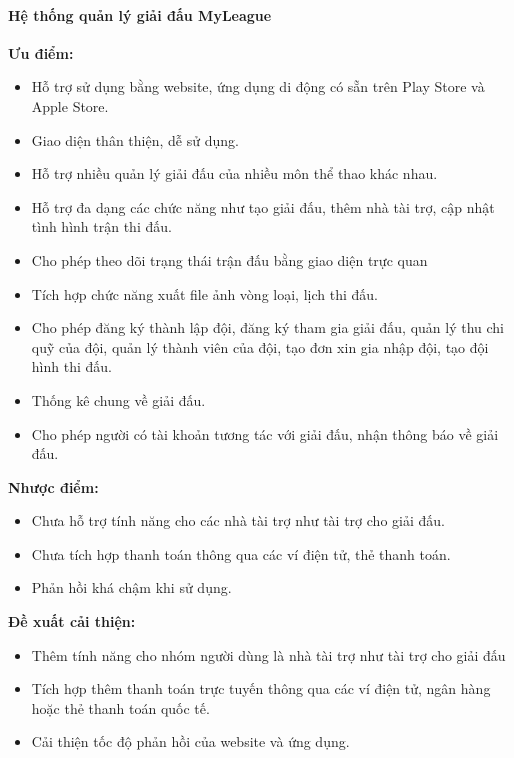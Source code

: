 \paragraph{Hệ thống quản lý giải đấu MyLeague}\mbox{}

\textbf{Ưu điểm:}
\begin{itemize}[itemindent=1cm]
  \item Hỗ trợ sử dụng bằng website, ứng dụng di động có sẵn trên Play Store và Apple Store.
  \item Giao diện thân thiện, dễ sử dụng.
  \item Hỗ trợ nhiều quản lý giải đấu của nhiều môn thể thao khác nhau.
  \item Hỗ trợ đa dạng các chức năng như tạo giải đấu, thêm nhà tài trợ, cập nhật tình hình trận thi đấu.
  \item Cho phép theo dõi trạng thái trận đấu bằng giao diện trực quan
  \item Tích hợp chức năng xuất file ảnh vòng loại, lịch thi đấu.
  \item Cho phép đăng ký thành lập đội, đăng ký tham gia giải đấu, quản lý thu chi quỹ của đội, quản lý thành viên của đội, tạo đơn xin gia nhập đội, tạo đội hình thi đấu.
  \item Thống kê chung về giải đấu.
  \item Cho phép người có tài khoản tương tác với giải đấu, nhận thông báo về giải đấu.

\end{itemize}

\textbf{Nhược điểm:}
\begin{itemize}[itemindent=1cm]
  \item Chưa hỗ trợ tính năng cho các nhà tài trợ như tài trợ cho giải đấu.
  \item Chưa tích hợp thanh toán thông qua các ví điện tử, thẻ thanh toán.
  \item Phản hồi khá chậm khi sử dụng.

\end{itemize}

\textbf{Đề xuất cải thiện:}
\begin{itemize} [itemindent=1cm]
  \item Thêm tính năng cho nhóm người dùng là nhà tài trợ như tài trợ cho giải đấu
  \item Tích hợp thêm thanh toán trực tuyến thông qua các ví điện tử, ngân hàng hoặc thẻ thanh toán quốc tế.
  \item Cải thiện tốc độ phản hồi của website và ứng dụng.

\end{itemize}
